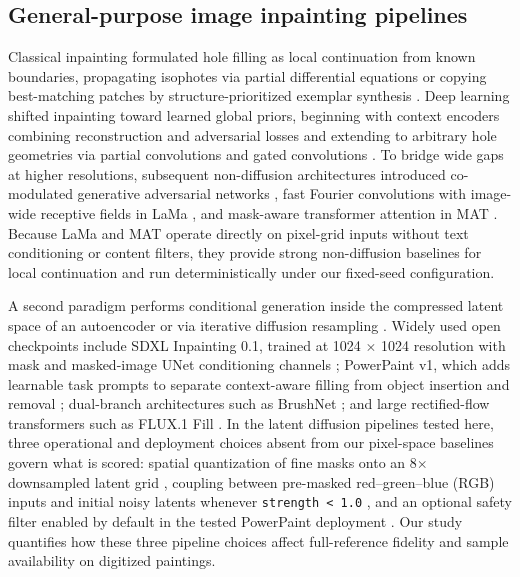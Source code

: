 \documentclass[fleqn,12pt,lineno]{wlpeerj}
\begin{document}
\subsection{General-purpose image inpainting pipelines}\label{general-purpose-image-inpainting-pipelines}

Classical inpainting formulated hole filling as local continuation from known boundaries, propagating isophotes via partial differential equations \citep{bertalmio2000} or copying best-matching patches by structure-prioritized exemplar synthesis \citep{criminisi2004}. Deep learning shifted inpainting toward learned global priors, beginning with context encoders combining reconstruction and adversarial losses \citep{pathak2016} and extending to arbitrary hole geometries via partial convolutions \citep{liu2018} and gated convolutions \citep{yu2018}. To bridge wide gaps at higher resolutions, subsequent non-diffusion architectures introduced co-modulated generative adversarial networks \citep{zhao2021}, fast Fourier convolutions with image-wide receptive fields in LaMa \citep{suvorov2021}, and mask-aware transformer attention in MAT \citep{li2022mat}. Because LaMa and MAT operate directly on pixel-grid inputs without text conditioning or content filters, they provide strong non-diffusion baselines for local continuation and run deterministically under our fixed-seed configuration.

A second paradigm performs conditional generation inside the compressed latent space of an autoencoder \citep{rombach2021} or via iterative diffusion resampling \citep{lugmayr2022}. Widely used open checkpoints include SDXL Inpainting 0.1, trained at 1024 \ensuremath{\times} 1024 resolution with mask and masked-image UNet conditioning channels \citep{sdxlinpaint}; PowerPaint v1, which adds learnable task prompts to separate context-aware filling from object insertion and removal \citep{zhuang2023}; dual-branch architectures such as BrushNet \citep{ju2024}; and large rectified-flow transformers such as FLUX.1 Fill \citep{fluxfill}. In the latent diffusion pipelines tested here, three operational and deployment choices absent from our pixel-space baselines govern what is scored: spatial quantization of fine masks onto an 8\ensuremath{\times} downsampled latent grid \citep{shamsolmoali2025tdpaint, ju2024, diffuserssdxl0352, powerpaintv1src}, coupling between pre-masked red--green--blue (RGB) inputs and initial noisy latents whenever \texttt{strength\ \textless{}\ 1.0} \citep{diffuserssdxl0352, diffusers8450}, and an optional safety filter enabled by default in the tested PowerPaint deployment \citep{zhuang2023, powerpaintv1src}. Our study quantifies how these three pipeline choices affect full-reference fidelity and sample availability on digitized paintings.
\end{document}
